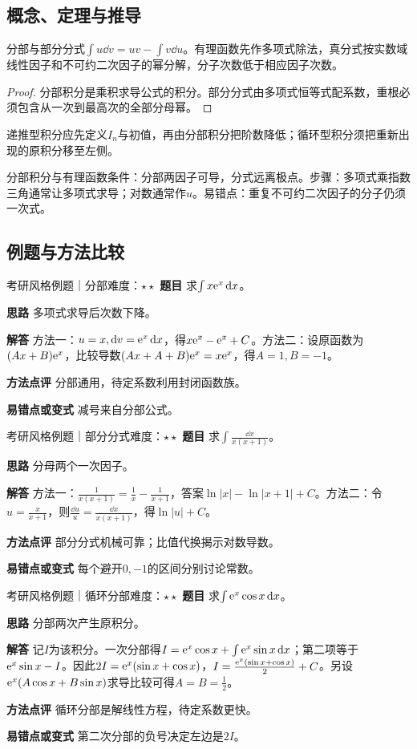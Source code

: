 \subsection{概念、定理与推导}

\begin{theorem}{分部与部分分式}$\int u\dd v=uv-\int v\dd u$。有理函数先作多项式除法，真分式按实数域线性因子和不可约二次因子的幂分解，分子次数低于相应因子次数。\end{theorem}
\begin{proof}分部积分是乘积求导公式的积分。部分分式由多项式恒等式配系数，重根必须包含从一次到最高次的全部分母幂。\end{proof}
递推型积分应先定义$I_n$与初值，再由分部积分把阶数降低；循环型积分须把重新出现的原积分移至左侧。

\begin{method}{分部积分与有理函数}条件：分部两因子可导，分式远离极点。步骤：多项式乘指数三角通常让多项式求导；对数通常作$u$。易错点：重复不可约二次因子的分子仍须一次式。\end{method}
\subsection{例题与方法比较}
\begin{example}{考研风格例题｜分部}{难度：$\star\star$}
\label{ex:3:4}\textbf{题目} 求$\int x\mathrm{e}^x\mathop{}\!\mathrm{d} x$。\par
\textbf{思路} 多项式求导后次数下降。\par
\textbf{解答} 方法一：$u=x,\mathop{}\!\mathrm{d} v=\mathrm{e}^x\mathop{}\!\mathrm{d} x$，得$x\mathrm{e}^x-\mathrm{e}^x+C$。方法二：设原函数为$(Ax+B)\mathrm{e}^x$，比较导数$(Ax+A+B)\mathrm{e}^x=x\mathrm{e}^x$，得$A=1,B=-1$。\par
\textbf{方法点评} 分部通用，待定系数利用封闭函数族。\par
\textbf{易错点或变式} 减号来自分部公式。
\end{example}
\begin{example}{考研风格例题｜部分分式}{难度：$\star\star$}
\label{ex:3:5}\textbf{题目} 求$\int\frac{\dd x}{x(x+1)}$。\par
\textbf{思路} 分母两个一次因子。\par
\textbf{解答} 方法一：$\frac{1}{x(x+1)}=\frac{1}{x}-\frac{1}{x+1}$，答案$\ln|x|-\ln|x+1|+C$。方法二：令$u=\frac{x}{x+1}$，则$\frac{\dd u}{u}=\frac{\dd x}{x(x+1)}$，得$\ln|u|+C$。\par
\textbf{方法点评} 部分分式机械可靠；比值代换揭示对数导数。\par
\textbf{易错点或变式} 每个避开$0,-1$的区间分别讨论常数。
\end{example}
\begin{example}{考研风格例题｜循环分部}{难度：$\star\star$}
\label{ex:3:6}\textbf{题目} 求$\int\mathrm{e}^x\cos x\mathop{}\!\mathrm{d} x$。\par
\textbf{思路} 分部两次产生原积分。\par
\textbf{解答} 记$I$为该积分。一次分部得$I=\mathrm{e}^x\cos x+\int\mathrm{e}^x\sin x\mathop{}\!\mathrm{d} x$；第二项等于$\mathrm{e}^x\sin x-I$。因此$2I=\mathrm{e}^x(\sin x+\cos x)$，$I=\frac{\mathrm{e}^x(\sin x+\cos x)}{2}+C$。另设$\mathrm{e}^x(A\cos x+B\sin x)$求导比较可得$A=B=\frac{1}{2}$。\par
\textbf{方法点评} 循环分部是解线性方程，待定系数更快。\par
\textbf{易错点或变式} 第二次分部的负号决定左边是$2I$。
\end{example}

